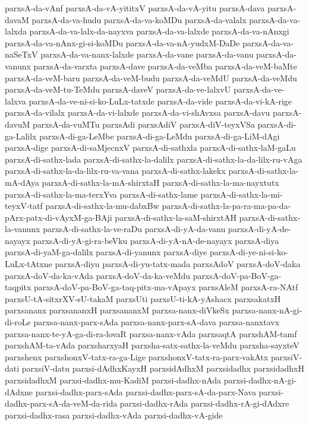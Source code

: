 {parxsA-da-vAnf
parxsA-da-vA-yititxV
parxsA-da-vA-yitu
parxsA-dava
parxsA-davaM
parxsA-da-va-hudu
parxsA-da-va-koMDu
parxsA-da-valalx
parxsA-da-va-lalxda
parxsA-da-va-lalx-da-nayxva
parxsA-da-va-lalxde
parxsA-da-va-nAnxgi
parxsA-da-va-nAnx-gi-si-koMDu
parxsA-da-va-nA-yudxM-DaDe
parxsA-da-va-naSeTxV
parxsA-da-va-nanx-lalxde
parxsA-da-vane
parxsA-da-vanu
parxsA-da-vanunx
parxsA-da-varxta
parxsA-dave
parxsA-da-veMba
parxsA-da-veM-baMte
parxsA-da-veM-baru
parxsA-da-veM-budu
parxsA-da-veMdU
parxsA-da-veMdu
parxsA-da-veM-tu-TeMdu
parxsA-daveV
parxsA-da-ve-lalxvU
parxsA-da-ve-lalxva
parxsA-da-ve-ni-si-ko-LuLx-tatxde
parxsA-da-vide
parxsA-da-vi-kA-rige
parxsA-da-vilalx
parxsA-da-vi-lalxde
parxsA-da-vi-shAvxsa
parxsA-davu
parxsA-davuM
parxsA-da-vuMTu
parxsAdi
parxsAdiV
parxsA-diV-teyxVSa
parxsA-di-ga-Lalilx
parxsA-di-ga-LeMbe
parxsA-di-ga-LeMdu
parxsA-di-ga-LiM-dAgi
parxsA-dige
parxsA-di-saMjecnxV
parxsA-di-sathxla
parxsA-di-sathx-laM-gaLu
parxsA-di-sathx-lada
parxsA-di-sathx-la-dalilx
parxsA-di-sathx-la-da-lilx-ru-vAga
parxsA-di-sathx-la-da-lilx-ru-va-vana
parxsA-di-sathx-lakekx
parxsA-di-sathx-la-mA-dAya
parxsA-di-sathx-la-mA-shirxtaH
parxsA-di-sathx-la-ma-nayxtutx
parxsA-di-sathx-la-ma-terxYva
parxsA-di-sathx-lame
parxsA-di-sathx-la-mi-teyxV-tatf
parxsA-di-sathx-la-mu-dabxBw
parxsA-di-sathx-la-pa-ra-ma-pa-da-pArx-patx-di-vAyxM-ga-BAji
parxsA-di-sathx-la-saM-shirxtAH
parxsA-di-sathx-la-vanunx
parxsA-di-sathx-la-ve-raDu
parxsA-di-yA-da-vanu
parxsA-di-yA-de-nayayx
parxsA-di-yA-gi-ra-beVku
parxsA-di-yA-nA-de-nayayx
parxsA-diya
parxsA-di-yaM-ga-dalilx
parxsA-di-yanunx
parxsA-diye
parxsA-di-ye-ni-si-ko-LuLx-tAtxne
parxsA-diyu
parxsA-di-yu-tatx-mada
parxsAdoV
parxsA-doV-daka
parxsA-doV-da-ka-vAda
parxsA-doV-da-ka-veMdu
parxsA-doV-pa-BoV-ga-taqpitx
parxsA-doV-pa-BoV-ga-taq-pitx-ma-vApayx
parxsAleM
parxsA-ra-NAtf
parxsU-tA-sitxrXV-sU-takaM
parxsUti
parxsU-ti-kA-yAshacx
parxsakatxH
parxsananx
parxsananxH
parxsananxM
parxsa-nanx-diVkeSx
parxsa-nanx-nA-gi-di-roLe
parxsa-nanx-parx-sAda
parxsa-nanx-parx-sA-dava
parxsa-nanxtavx
parxsa-nanx-te-yA-ga-di-ra-lovaR
parxsa-nanx-vAda
parxsaqtA
parxshAM-tamf
parxshAM-ta-vAda
parxsharxyaH
parxsha-satx-sathx-la-veMdu
parxsha-sayxteV
parxshenx
parxshonxV-tatx-ra-ga-Lige
parxshonxV-tatx-ra-parx-vakAtx
parxsiV-dati
parxsiV-datu
parxsi-dAdhxKayxH
parxsidAdhxM
parxsidadhx
parxsidadhxH
parxsidadhxM
parxsi-dadhx-mu-KadiM
parxsi-dadhx-nAda
parxsi-dadhx-nA-gi-dAdxne
parxsi-dadhx-parx-sAda
parxsi-dadhx-parx-sA-da-parx-Nava
parxsi-dadhx-parx-sA-da-veM-da-rida
parxsi-dadhx-rAda
parxsi-dadhx-rA-gi-dAdxre
parxsi-dadhx-rasa
parxsi-dadhx-vAda
parxsi-dadhx-vA-gide
}

